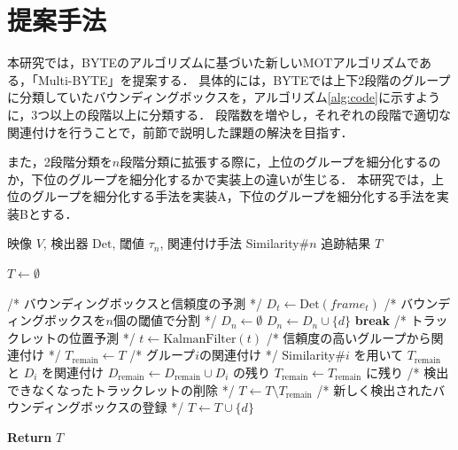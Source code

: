 \documentclass[a4paper,10pt,twocolumn,uplatex]{jsarticle}
\begin{document}
\section{提案手法}
本研究では，BYTEのアルゴリズムに基づいた新しいMOTアルゴリズムである，「Multi-BYTE」を提案する．
具体的には，BYTEでは上下2段階のグループに分類していたバウンディングボックスを，アルゴリズム\ref{alg:code}に示すように，3つ以上の段階以上に分類する．
段階数を増やし，それぞれの段階で適切な関連付けを行うことで，前節で説明した課題の解決を目指す．
\par
また，2段階分類を$n$段階分類に拡張する際に，上位のグループを細分化するのか，下位のグループを細分化するかで実装上の違いが生じる．
本研究では，上位のグループを細分化する手法を実装A，下位のグループを細分化する手法を実装Bとする．

\begin{algorithm}[htb]
  \caption{提案手法Multi-BYTEの疑似コード}
  \label{alg:code}
  \begin{algorithmic}[1]
    \small
    
    \Require 映像 $V$, 検出器 $\text{Det}$, 閾値 $\tau_n$, 関連付け手法 Similarity$\#n$
    \Ensure 追跡結果 $T$
    
    \State $T \gets \emptyset$
    
      \State /* バウンディングボックスと信頼度の予測 */
      \State $D_t \gets \text{Det}(frame_t)$  
      \State
      \State /* バウンディングボックスを$n$個の閾値で分割 */
        \State $D_n \gets \emptyset$
      \EndFor
              \State $D_n \gets D_n \cup \{d\}$
              \State \textbf{break}
          \EndIf
        \EndFor
      \EndFor
      \State
      \State /*  トラックレットの位置予測 */
          \State $t \gets \text{KalmanFilter}(t)$
      \EndFor
      \State
      \State /* 信頼度の高いグループから関連付け */
      \State $T_\text{remain} \gets T$
        \State /* グループ$i$の関連付け */
        \State Similarity\#$i$ を用いて $T_\text{remain}$ と $D_i$ を関連付け
        \State $D_\text{remain} \gets D_\text{remain} \cup D_i$ の残り
        \State $T_\text{remain} \gets T_\text{remain}$ に残り
      \EndFor
      \State
      \State /* 検出できなくなったトラックレットの削除 */
      \State $T \gets T \setminus T_\text{remain}$
      \State
      \State /* 新しく検出されたバウンディングボックスの登録 */
          \State $T \gets T \cup \{d\}$
        \EndIf
      \EndFor
    \EndFor
    
    \State \textbf{Return} $T$
  \end{algorithmic}
\end{algorithm}
\end{document}
